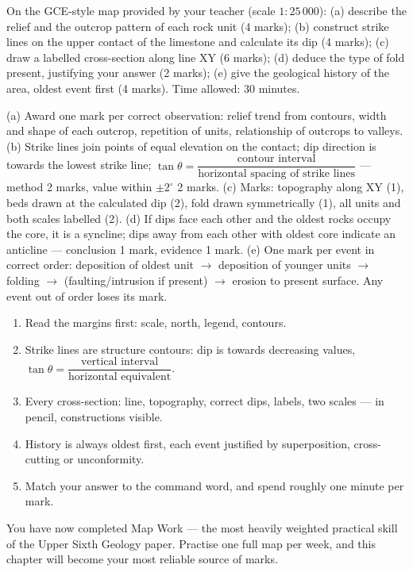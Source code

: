 \documentclass[11pt]{article}
\newcommand{\cle}[1]{{\popxbold\color{popdark}#1}}
\begin{document}
\begin{exercice}
On the GCE-style map provided by your teacher (scale $1:25\,000$): (a) describe the relief and the outcrop pattern of each rock unit (4 marks); (b) construct strike lines on the upper contact of the limestone and calculate its dip (4 marks); (c) draw a labelled cross-section along line XY (6 marks); (d) deduce the type of fold present, justifying your answer (2 marks); (e) give the geological history of the area, oldest event first (4 marks). Time allowed: 30 minutes.
\end{exercice}

\begin{corrige}
(a) Award one mark per correct observation: relief trend from contours, width and shape of each outcrop, repetition of units, relationship of outcrops to valleys. (b) Strike lines join points of equal elevation on the contact; dip direction is towards the lowest strike line; $\tan\theta = \dfrac{\text{contour interval}}{\text{horizontal spacing of strike lines}}$ --- method 2 marks, value within $\pm 2^{\circ}$ 2 marks. (c) Marks: topography along XY (1), beds drawn at the calculated dip (2), fold drawn symmetrically (1), all units and both scales labelled (2). (d) If dips face each other and the oldest rocks occupy the core, it is a \cle{syncline}; dips away from each other with oldest core indicate an \cle{anticline} --- conclusion 1 mark, evidence 1 mark. (e) One mark per event in correct order: deposition of oldest unit $\rightarrow$ deposition of younger units $\rightarrow$ folding $\rightarrow$ (faulting/intrusion if present) $\rightarrow$ erosion to present surface. Any event out of order loses its mark.
\end{corrige}

\begin{aretenir}
\begin{enumerate}
\item Read the margins first: scale, north, legend, contours.
\item Strike lines are structure contours: dip is towards decreasing values, $\tan\theta = \dfrac{\text{vertical interval}}{\text{horizontal equivalent}}$.
\item Every cross-section: line, topography, correct dips, labels, two scales --- in pencil, constructions visible.
\item History is always oldest first, each event justified by superposition, cross-cutting or unconformity.
\item Match your answer to the command word, and spend roughly one minute per mark.
\end{enumerate}
You have now completed Map Work --- the most heavily weighted practical skill of the Upper Sixth Geology paper. Practise one full map per week, and this chapter will become your most reliable source of marks.
\end{aretenir}
\end{document}
